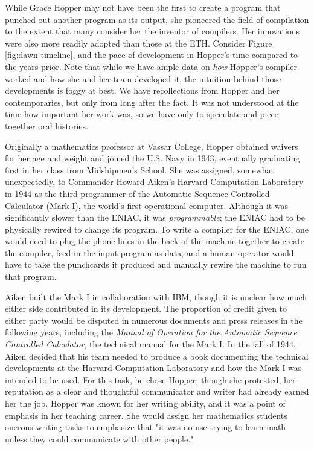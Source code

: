 While Grace Hopper may not have been the first to create a program that
punched out another program as its output, she pioneered the field of
compilation to the extent that many consider her the inventor of compilers.
Her innovations were also more readily adopted than those at the ETH.
Consider Figure \ref{fig:dawn-timeline}, and the pace of development in Hopper's time
compared to the years prior.
Note that while we have ample data on \textit{how} Hopper's compiler worked and how
she and her team developed it, the intuition behind those developments is foggy at best.
We have recollections from Hopper and her contemporaries, but only from long after the fact.
It was not understood at the time how important her work was, so we have
only to speculate and piece together oral histories.

Originally a mathematics professor at Vassar College, Hopper obtained waivers for her age and weight and
joined the U.S. Navy in 1943, eventually graduating first in her class from Midshipmen's School.
She was assigned, somewhat unexpectedly, to Commander Howard Aiken's Harvard Computation Laboratory in 1944
as the third programmer of the Automatic Sequence Controlled Calculator (Mark I), 
the world's first operational computer.
Although it was significantly slower than the ENIAC, it was \textit{programmable};
the ENIAC had to be physically rewired to change its program.
To write a compiler for the ENIAC, one would need to plug the phone lines in the back of the machine
together to create the compiler, feed in the input program as data, and a human operator would have
to take the punchcards it produced and manually rewire the machine to run that program.

Aiken built the Mark I in collaboration with IBM, though it is unclear how much either side contributed
in its development.
The proportion of credit given to either party would be disputed in numerous documents and press releases
in the following years, including the
\textit{Manual of Operation for the Automatic Sequence Controlled Calculator},
the technical manual for the Mark I.
In the fall of 1944, Aiken decided that his team needed to produce a book documenting the technical
developments at the Harvard Computation Laboratory and how the Mark I was intended to be used.
For this task, he chose Hopper; though she protested, her reputation as a clear and
thoughtful communicator and writer had already earned her the job.
Hopper was known for her writing ability, and it was a point of emphasis in her teaching career.
She would assign her mathematics students onerous writing tasks to emphasize that
"it was no use trying to learn math unless they could communicate with other people."
\cite[interview on 5 July, 1972]{grace_hopper_and_the_invention_of_the_information_age_2009}


